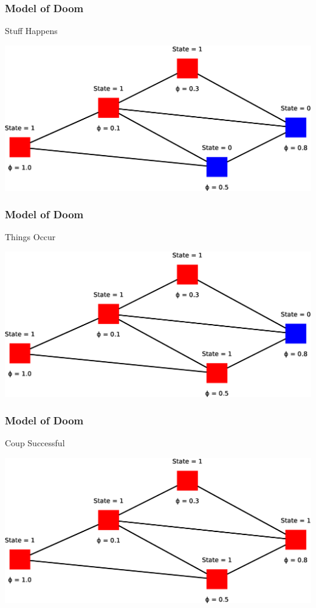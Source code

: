 \begin{frame}
    \frametitle{Model of Doom}
    \begin{itemize}
        \gitem Stuff Happens
    \end{itemize}
    \vfill
    \includegraphics[width=\textwidth]{img/model7}
    \vfill
\end{frame}

\begin{frame}
    \frametitle{Model of Doom}
    \begin{itemize}
        \gitem Things Occur
    \end{itemize}
    \vfill
    \includegraphics[width=\textwidth]{img/model8}
    \vfill
\end{frame}

\begin{frame}
    \frametitle{Model of Doom}
    \begin{itemize}
        \gitem Coup Successful
    \end{itemize}
    \vfill
    \includegraphics[width=\textwidth]{img/model9}
    \vfill
\end{frame}
